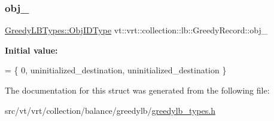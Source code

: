 \mbox{\label{structvt_1_1vrt_1_1collection_1_1lb_1_1_greedy_record_ab0e01d4431f547a017c9a4887bf5d207}} 
\subsubsection{\texorpdfstring{obj\+\_\+}{obj\_}}
{\footnotesize\ttfamily \hyperlink{structvt_1_1vrt_1_1collection_1_1lb_1_1_greedy_l_b_types_ae22670acd689e4ff83315fac2e4acb5e}{Greedy\+L\+B\+Types\+::\+Obj\+I\+D\+Type} vt\+::vrt\+::collection\+::lb\+::\+Greedy\+Record\+::obj\+\_\+\hspace{0.3cm}{\ttfamily [private]}}

{\bfseries Initial value\+:}
\begin{DoxyCode}
= \{
    0, uninitialized\_destination, uninitialized\_destination
  \}
\end{DoxyCode}


The documentation for this struct was generated from the following file\+:\begin{DoxyCompactItemize}
\item 
src/vt/vrt/collection/balance/greedylb/\hyperlink{greedylb__types_8h}{greedylb\+\_\+types.\+h}\end{DoxyCompactItemize}
